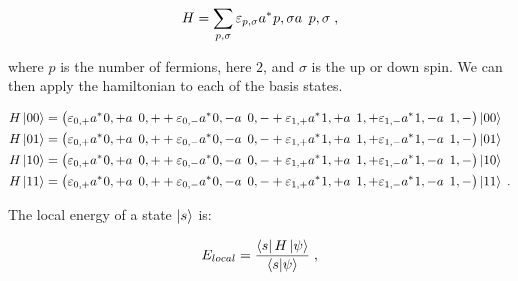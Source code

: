 \begin{equation}
    H =\sum_{p,\sigma} \varepsilon_{p,\sigma}\hc{a}{p,\sigma}\op{a}{p,\sigma} \; ,
\end{equation}

where $p$ is the number of fermions, here $2$, and $\sigma$ is the up or down spin. We can then apply the hamiltonian to each of the basis states.

\begin{align}
    H\ket{00} &= \left ( \varepsilon_{0,+} \hc{a}{0,+} \op{a}{0,+} + \varepsilon_{0,-} \hc{a}{0,-} \op{a}{0,-} +\varepsilon_{1,+} \hc{a}{1,+} \op{a}{1,+} \varepsilon_{1,-} \hc{a}{1,-} \op{a}{1,-} \right ) \ket{00}\\
    H\ket{01} &= \left ( \varepsilon_{0,+} \hc{a}{0,+} \op{a}{0,+} + \varepsilon_{0,-} \hc{a}{0,-} \op{a}{0,-} +\varepsilon_{1,+} \hc{a}{1,+} \op{a}{1,+} \varepsilon_{1,-} \hc{a}{1,-} \op{a}{1,-} \right 
    )\ket{01}\\
    H\ket{10} &= \left ( \varepsilon_{0,+} \hc{a}{0,+} \op{a}{0,+} + \varepsilon_{0,-} \hc{a}{0,-} \op{a}{0,-} +\varepsilon_{1,+} \hc{a}{1,+} \op{a}{1,+} \varepsilon_{1,-} \hc{a}{1,-} \op{a}{1,-} \right ) \ket{10}\\
    H\ket{11} &= \left ( \varepsilon_{0,+} \hc{a}{0,+} \op{a}{0,+} + \varepsilon_{0,-} \hc{a}{0,-} \op{a}{0,-} +\varepsilon_{1,+} \hc{a}{1,+} \op{a}{1,+} \varepsilon_{1,-} \hc{a}{1,-} \op{a}{1,-} \right ) \ket{11} \; .
\end{align}

The local energy of a state $\ket{s}$ is:

\begin{equation}
    E_{local} = \frac{\bra{s} H \ket{\psi}}{\braket{s}{\psi}}    \; ,
\end{equation}


